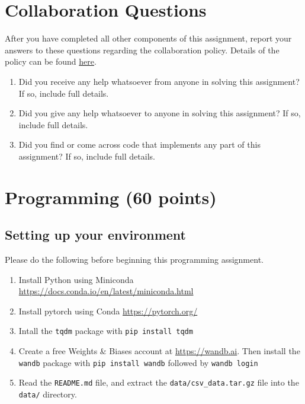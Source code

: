 \documentclass[11pt,addpoints,answers]{exam}
\begin{document}
\begin{questions}
\begin{parts}
    
\end{parts}\newpage
\section{Collaboration Questions}

After you have completed all other components of this assignment, report your answers to these questions regarding the collaboration policy. Details of the policy can be found \href{http://www.cs.cmu.edu/~mgormley/courses/10601/syllabus.html}{here}.
\begin{enumerate}
    \item Did you receive any help whatsoever from anyone in solving this assignment? If so, include full details.
    \item Did you give any help whatsoever to anyone in solving this assignment? If so, include full details.
    \item Did you find or come across code that implements any part of this assignment? If so, include full details.
\end{enumerate}

\begin{your_solution}[height=6cm]

\end{your_solution}
\end{questions}

\newpage
\section{Programming (60 points)}

\subsection{Setting up your environment}

Please do the following before beginning this programming assignment.
\begin{enumerate}
    \item Install Python using Miniconda \url{https://docs.conda.io/en/latest/miniconda.html}
    \item Install pytorch using Conda \url{https://pytorch.org/}
    \item Intall the \lstinline{tqdm} package with \lstinline{pip install tqdm}
    \item Create a free Weights \& Biases account at \url{https://wandb.ai}. Then install the \lstinline{wandb} package with \lstinline{pip install wandb} followed by \lstinline{wandb login}
    \item Read the \lstinline{README.md} file, and extract the \lstinline{data/csv_data.tar.gz} file into the \lstinline{data/} directory.
\end{enumerate}
\end{document}
